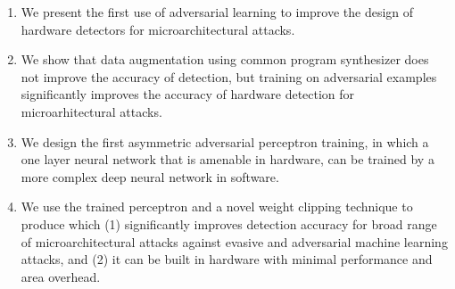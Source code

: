 \begin{enumerate}
\item We present the first use of adversarial learning to improve the
design of hardware detectors for microarchitectural attacks. 
\vspace{2mm}

\item We show that data augmentation using common program synthesizer does not improve the accuracy of detection, but training on adversarial examples significantly improves the accuracy of hardware detection for microarhitectural attacks. 

\item We design the first asymmetric  adversarial perceptron training, in which a one layer neural network that is amenable in hardware, can be trained by a more complex deep neural network in software.
\vspace{2mm}

\item We use the trained perceptron and a novel weight clipping technique to produce \scheme{} which (1) significantly improves detection accuracy for broad range of microarchitectural attacks against evasive and adversarial machine learning attacks, and (2) it can be built in hardware with minimal performance and area overhead. 
\end{enumerate}
